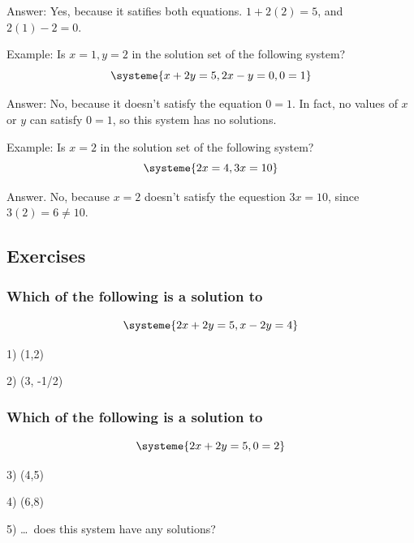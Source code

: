 \documentclass[a4paper,twoside,12pt]{memoir}  %
\begin{document}
Answer: Yes, because it satifies both equations. $1 + 2(2) = 5$, and $2(1) - 2 = 0$.

Example:
Is $x = 1, y = 2$ in the solution set of the following system?
\begin{equation*}
  \systeme{
    x + 2y = 5,
    2x - y = 0,
         0 = 1
  }
\end{equation*}

Answer: No, because it doesn't satisfy the equation $0=1$. In fact, no values of $x$ or $y$ can satisfy $0=1$, so this system has no solutions.

Example:
Is $x = 2$ in the solution set of the following system?
\begin{equation*}
  \systeme{
    2x = 4,
    3x = 10
  }
\end{equation*}

Answer. No, because $x=2$ doesn't satisfy the equestion $3x=10$, since $3(2) = 6 \neq 10$.

\subsection{Exercises}
\subsubsection{Which of the following is a solution to}
\begin{equation*}
  \systeme{
    2x + 2y = 5,
    x  - 2y = 4
  }
\end{equation*}

\begin{list}{}
\item 1) (1,2)
\item 2) (3, -1/2)
\end{list}

\subsubsection{Which of the following is a solution to}
\begin{equation*}
  \systeme{
    2x + 2y = 5,
          0 = 2
  }
\end{equation*}

\begin{list}{}
\item 3) (4,5)
\item 4) (6,8)
\item 5) \ldots\ does this system have any solutions?
\end{list}
\end{document}
